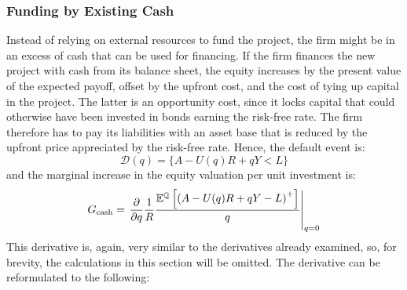 \documentclass[main.tex]{subfiles}
\begin{document}
    \subsubsection{Funding by Existing Cash}
        Instead of relying on external resources to fund the project,
        the firm might be in an excess of cash that can be used for financing.
        If the firm finances the new project with cash from its balance sheet, 
        the equity increases by the present value of the expected payoff,
        offset by the upfront cost, and the cost of tying up capital in the project.
        The latter is an opportunity cost, since it locks capital
        that could otherwise have been invested in bonds earning the risk-free rate.
        The firm therefore has to pay its liabilities with an asset base that is
        reduced by the upfront price appreciated by the risk-free rate.
        Hence, the default event is:
            \begin{equation*}
                \mathcal{D}(q)
                = 
                \{
                    A - U(q)R + qY < L
                \}
            \end{equation*}
        and the marginal increase in the equity valuation per unit investment is:
            \begin{equation*}
                G_{\text{cash}} =
                    \left.
                    \frac{\partial }{\partial q} 
                    \frac{1}{R}
                    \frac{
                        \mathbb{E}^{\mathbb{Q}}\left[
                            \left(
                                A - U(q)R + qY - L
                            \right)^{+}
                        \right] 
                    }{
                        q
                    } 
                    \right\rvert_{q=0}
            \end{equation*}
        This derivative is, again, very similar to the derivatives already examined,
        so, for brevity, the calculations in this section will be omitted.
        The derivative can be reformulated to the following:
\end{document}
